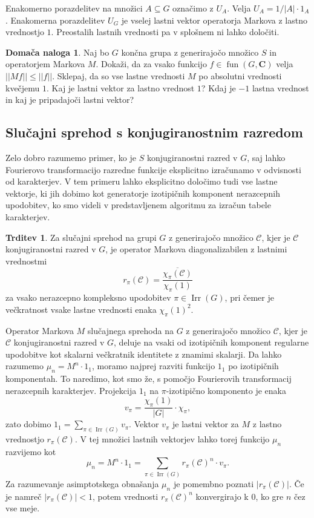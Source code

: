 \documentclass[11pt]{book}
\def\CC{\mathbf{C}}
\def\conclass{\mathcal{C}}
\DeclareMathOperator\Irr{Irr}
\DeclareMathOperator\fun{fun}
\theoremstyle{definition}
\theoremstyle{zgled}
\theoremstyle{odprtproblem}
\theoremstyle{domacanaloga}
\newtheorem*{domacanaloga}{Domača naloga}
\theoremstyle{izrek}
\newtheorem*{trditev}{Trditev}
\begin{document}
Enakomerno porazdelitev na množici $A \subseteq G$ označimo z $U_A$. Velja $U_A = 1/|A| \cdot 1_A$. Enakomerna porazdelitev $U_G$ je vselej lastni vektor operatorja Markova z lastno vrednostjo $1$. Preostalih lastnih vrednosti pa v splošnem ni lahko določiti.

\begin{domacanaloga}
Naj bo $G$ končna grupa z generirajočo množico $S$ in operatorjem Markova $M$. Dokaži, da za vsako funkcijo $f \in \fun(G,\CC)$ velja $||Mf|| \leq ||f||$. Sklepaj, da so vse lastne vrednosti $M$ po absolutni vrednosti kvečjemu $1$. Kaj je lastni vektor za lastno vrednost $1$? Kdaj je $-1$ lastna vrednost in kaj je pripadajoči lastni vektor?
\end{domacanaloga}

\subsection{Slučajni sprehod s konjugiranostnim razredom}

Zelo dobro razumemo primer, ko je $S$ konjugiranostni razred v $G$, saj lahko Fourierovo transformacijo razredne funkcije eksplicitno izračunamo v odvisnosti od karakterjev. V tem primeru lahko eksplicitno določimo tudi vse lastne vektorje, ki jih dobimo kot generatorje izotipičnih komponent nerazcepnih upodobitev, ko smo videli v predstavljenem algoritmu za izračun tabele karakterjev.

\begin{trditev}
Za slučajni sprehod na grupi $G$ z generirajočo množico $\conclass$, kjer je $\conclass$ konjugiranostni razred v $G$, je operator Markova diagonalizabilen z lastnimi vrednostmi
\[
    r_{\pi}(\conclass) = \frac{\overline{\chi_{\pi}(\conclass)}}{\chi_{\pi}(1)}
\]
za vsako nerazcepno kompleksno upodobitev $\pi \in \Irr(G)$, pri čemer je večkratnost vsake lastne vrednosti enaka $\chi_{\pi}(1)^2$.
\end{trditev}

Operator Markova $M$ slučajnega sprehoda na $G$ z generirajočo množico $\conclass$, kjer je $\conclass$ konjugiranostni razred v $G$, deluje na vsaki od izotipičnih komponent regularne upodobitve kot skalarni večkratnik identitete z znamimi skalarji. Da lahko razumemo $\mu_n = M^n \cdot 1_1$, moramo najprej razviti funkcijo $1_1$ po izotipičnih komponentah. To naredimo, kot smo že, s pomočjo Fourierovih transformacij nerazcepnih karakterjev. Projekcija $1_1$ na $\pi$-izotipično komponento je enaka
\[
    v_{\pi} = \frac{\chi_{\pi}(1)}{|G|} \cdot \chi_{\pi},
\] 
zato dobimo $1_1 = \sum_{\pi \in \Irr(G)} v_{\pi}$. Vektor $v_{\pi}$ je lastni vektor za $M$ z lastno vrednostjo $r_{\pi}(\conclass)$. V tej množici lastnih vektorjev lahko torej funkcijo $\mu_n$ razvijemo kot
\[
    \mu_n = M^n \cdot 1_1 = \sum_{\pi \in \Irr(G)} r_{\pi}(\conclass)^n \cdot v_{\pi}.
\]
Za razumevanje asimptotskega obnašanja $\mu_n$ je pomembno poznati $|r_{\pi}(\conclass)|$. Če je namreč $|r_{\pi}(\conclass)| < 1$, potem vrednosti $r_{\pi}(\conclass)^n$ konvergirajo k $0$, ko gre $n$ čez vse meje.
\end{document}
